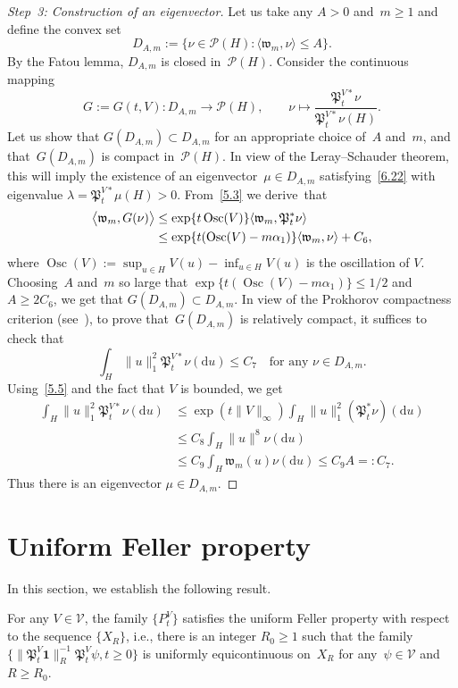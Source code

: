 \documentclass[AHL,Unicode,longabstracts]{cedram}
\DeclareMathOperator{\Osc}{Osc}
\newcommand{\mek}{{\mathbf 1}}
\newcommand{\PP}{{\mathcal P}}
\newcommand{\VV}{{\mathcal V}}
\newcommand{\la}{\lambda}
\newcommand{\ty}{\infty}
\newcommand{\wwww}{{\mathfrak w}}
\newcommand{\PPPP}{{\mathfrak P}}
\newcommand{\lag}{\langle}
\newcommand{\rag}{\rangle}
\newcommand{\dd}{\mathrm{d}}
\begin{document}
\begin{proofc}
\begin{proof}[Step~3: Construction of an eigenvector]
Let us take any $A>0$ and~$m\ge 1$ and define the convex set
\[
D_{A,m}:=\bigl\{\nu\in\PP(H): \langle\wwww_m,\nu\rangle\le A\bigr\}.
\]
By the Fatou lemma, $D_{A,m}$ is closed in~$\PP(H)$.
Consider the continuous mapping
\[
G:=G(t,V):D_{A,m}\to \PP(H), \quad\quad \nu \mapsto \frac{\PPPP_t^{V*}\nu}{\PPPP_t^{V*}\nu(H)}.
\]
Let us show that $G(D_{A,m})\subset D_{A,m}$ for an appropriate choice of~$A$ and~$m$, and that~$G(D_{A,m})$ is compact in~$\PP(H)$. In view of the Leray--Schauder theorem, this will imply the existence of an eigenvector~$\mu\in D_{A,m}$ satisfying~\eqref{6.22} with eigenvalue $\la=\PPPP_t^{V*}\mu(H)>0$. From~\eqref{5.3} we derive~that
\begin{align*}
\bigl\langle\wwww_m,G(\nu)\bigr\rangle &\le \exp\{t\Osc(V)\}\lag \wwww_m, \PPPP_t^*\nu \rag
\notag\\
&\le \exp\{t(\Osc(V)-m\alpha_1)\}\langle\wwww_m,\nu\rangle+C_{6},
\end{align*}
where $ \Osc(V):=\sup_{u\in H} V(u)-\inf_{u\in H} V(u)$ is the oscillation of $V$. Choosing~$A$ and~$m$ so large that $\exp\{t(\Osc(V)-m\alpha_1)\}\le 1/2$ and $A\ge 2 C_{6}$, we get that $G(D_{A,m})\subset D_{A,m}$. In view of the Prokhorov compactness criterion (see~\cite[Theorem~11.5.4]{dudley2002}), to prove that~$G(D_{A,m})$ is relatively compact, it suffices to check that
\[
\int_{H}\|u\|_1^2 \PPPP_t^{V*}\nu(\dd u)\le C_{7}\quad\mbox{for any $\nu\in D_{A,m}$}.
\]
Using~\eqref{5.5} and the fact that $V$ is bounded, we get
\begin{align*}
\int_{H}\|u\|_1^2 \PPPP_t^{V*}\nu(\dd u)&\le \exp(t\|V\|_\ty)\int_{H}\|u\|_1^2 (\PPPP_t^*\nu)(\dd u)\\&\le C_8 \int_H\|u\|^8 \nu(\dd u) \\&\le C_{9} \int_H\wwww_m(u) \nu(\dd u) \le C_{9} A=:C_7.
\end{align*}
Thus there is an eigenvector $\mu\in D_{A,m}$.
\end{proof}
\let\qed\relax
\end{proofc}


\section{Uniform Feller property}\label{S:3}

In this section, we establish the following result.

\begin{theo}\label{T:3.1}
For any $V\in \VV$, the family $\{P_t^V\} $ satisfies the uniform Feller property with respect to the sequence $\{X_R\}$, i.e., there is an integer $R_0\ge1$ such that the family $\{\|\PPPP_t^V{\mek}\|_R^{-1}\PPPP_t^V\psi,t\ge0\}$ is uniformly equicontinuous on~$X_R$ for any~$\psi\in \VV$ and~$R\ge R_0$.
\end{theo}
\end{document}
